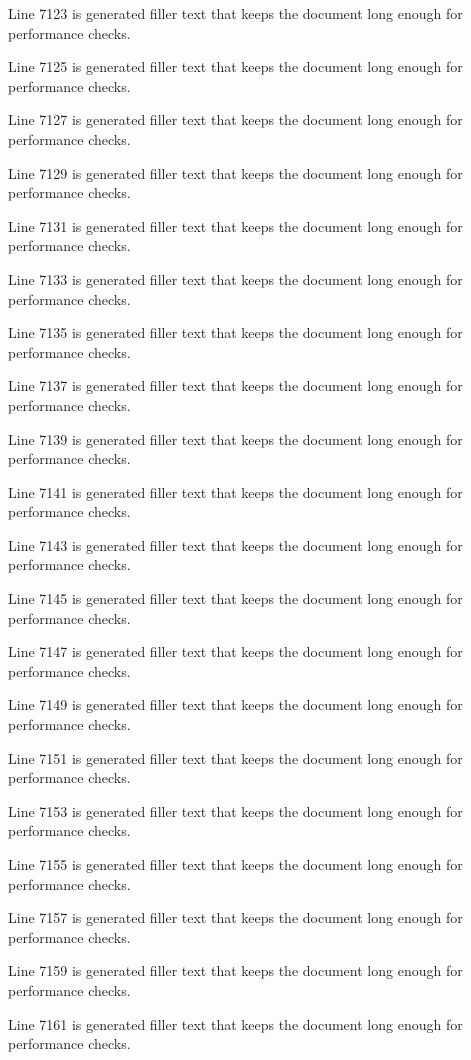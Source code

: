 Line 7123 is generated filler text that keeps the document long enough for performance checks.

Line 7125 is generated filler text that keeps the document long enough for performance checks.

Line 7127 is generated filler text that keeps the document long enough for performance checks.

Line 7129 is generated filler text that keeps the document long enough for performance checks.

Line 7131 is generated filler text that keeps the document long enough for performance checks.

Line 7133 is generated filler text that keeps the document long enough for performance checks.

Line 7135 is generated filler text that keeps the document long enough for performance checks.

Line 7137 is generated filler text that keeps the document long enough for performance checks.

Line 7139 is generated filler text that keeps the document long enough for performance checks.

Line 7141 is generated filler text that keeps the document long enough for performance checks.

Line 7143 is generated filler text that keeps the document long enough for performance checks.

Line 7145 is generated filler text that keeps the document long enough for performance checks.

Line 7147 is generated filler text that keeps the document long enough for performance checks.

Line 7149 is generated filler text that keeps the document long enough for performance checks.

Line 7151 is generated filler text that keeps the document long enough for performance checks.

Line 7153 is generated filler text that keeps the document long enough for performance checks.

Line 7155 is generated filler text that keeps the document long enough for performance checks.

Line 7157 is generated filler text that keeps the document long enough for performance checks.

Line 7159 is generated filler text that keeps the document long enough for performance checks.

Line 7161 is generated filler text that keeps the document long enough for performance checks.

